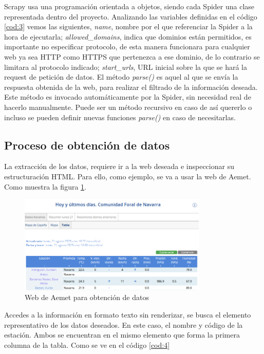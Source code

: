 Scrapy usa una programación orientada a objetos, siendo cada Spider una clase representada dentro del proyecto.\newline
\newline
Analizando las variables definidas en el código \ref{cod:3} vemos las siguientes, \textit{name}, nombre por el que referenciar la Spider a la hora de ejecutarla; \textit{allowed\_domains}, indica que dominios están permitidos, es importante no especificar protocolo, de esta manera funcionara para cualquier web ya sea HTTP como HTTPS que pertenezca a ese dominio, de lo contrario se limitara al protocolo indicado; \textit{start\_urls}, URL inicial sobre la que se hará la request de petición de datos.\newline
\newline
El método \textit{parse()} es aquel al que se envía la respuesta obtenida de la web, para realizar el filtrado de la información deseada. Este método es invocado automáticamente por la Spider, sin necesidad real de hacerlo manualmente. Puede ser un método recursivo en caso de así quererlo o incluso se pueden definir nuevas funciones \textit{parse()} en caso de necesitarlas.

\subsection{Proceso de obtención de datos}
La extracción de los datos, requiere ir a la web deseada e inspeccionar su estructuración HTML. Para ello, como ejemplo, se va a usar la web de Aemet. Como muestra la figura \ref{fig:ej13}.

\begin{figure} [H]
	\centering
	\includegraphics[width=0.8\textwidth]{fig/AemetCode.png}
	\caption[URL de inicio para obtener los códigos de las estaciones de Aemet]{Web de Aemet para obtención de datos}
	\label{fig:ej13}
\end{figure}

Accedes a la información en formato texto sin renderizar, se busca el elemento representativo de los datos deseados. En este caso, el nombre y código de la estación. Ambos se encuentran en el mismo elemento que forma la primera columna de la tabla. Como se ve en el código \ref{cod:4}

